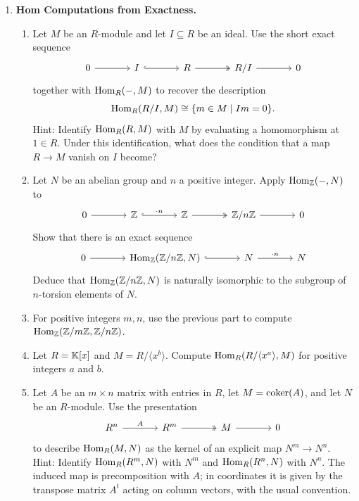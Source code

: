 \documentclass[12pt,reqno]{amsart}
\begin{document}
\begin{enumerate}[leftmargin=*, resume=problems]
\item \textbf{Hom Computations from Exactness.}
\begin{enumerate}
\item Let $M$ be an $R$-module and let $I\subseteq R$ be an ideal. Use the short exact sequence
\[
\begin{tikzcd}[column sep=large]
0 \arrow[r] & I \arrow[r, hook] & R \arrow[r, two heads] & R/I \arrow[r] & 0
\end{tikzcd}
\]
together with $\operatorname{Hom}_R(-,M)$ to recover the description
\[
\operatorname{Hom}_R(R/I,M)\cong \{m\in M\mid Im=0\}.
\]
Hint: Identify $\operatorname{Hom}_R(R,M)$ with $M$ by evaluating a homomorphism at $1\in R$. Under this identification, what does the condition that a map $R\to M$ vanish on $I$ become?
\item Let $N$ be an abelian group and $n$ a positive integer. Apply $\operatorname{Hom}_{\mathbb{Z}}(-,N)$ to
\[
\begin{tikzcd}[column sep=large]
0 \arrow[r] & \ZZ \arrow[r, hook, "\cdot n"] & \ZZ \arrow[r, two heads] & \ZZ/n\ZZ \arrow[r] & 0
\end{tikzcd}
\]
Show that there is an exact sequence
\[
\begin{tikzcd}[column sep=large]
0 \arrow[r] & \Hom_{\ZZ}(\ZZ/n\ZZ,N) \arrow[r, hook] & N \arrow[r, "\cdot n"] & N
\end{tikzcd}
\]
Deduce that $\operatorname{Hom}_{\mathbb{Z}}(\mathbb{Z}/n\mathbb{Z},N)$ is naturally isomorphic to the subgroup of $n$-torsion elements of $N$.
\item For positive integers $m,n$, use the previous part to compute $\operatorname{Hom}_{\mathbb{Z}}(\mathbb{Z}/m\mathbb{Z},\mathbb{Z}/n\mathbb{Z})$.
\item Let $R=\mathbb{K}[x]$ and $M=R/\langle x^b\rangle$. Compute $\operatorname{Hom}_R(R/\langle x^a\rangle,M)$ for positive integers $a$ and $b$.
\item Let $A$ be an $m\times n$ matrix with entries in $R$, let $M=\operatorname{coker}(A)$, and let $N$ be an $R$-module. Use the presentation
\[
\begin{tikzcd}[column sep=large]
R^n \arrow[r, "A"] & R^m \arrow[r, two heads] & M \arrow[r] & 0
\end{tikzcd}
\]
to describe $\operatorname{Hom}_R(M,N)$ as the kernel of an explicit map $N^m\to N^n$. Hint: Identify $\operatorname{Hom}_R(R^m,N)$ with $N^m$ and $\operatorname{Hom}_R(R^n,N)$ with $N^n$. The induced map is precomposition with $A$; in coordinates it is given by the transpose matrix $A^t$ acting on column vectors, with the usual convention.
\end{enumerate}


\end{enumerate}
\end{document}
